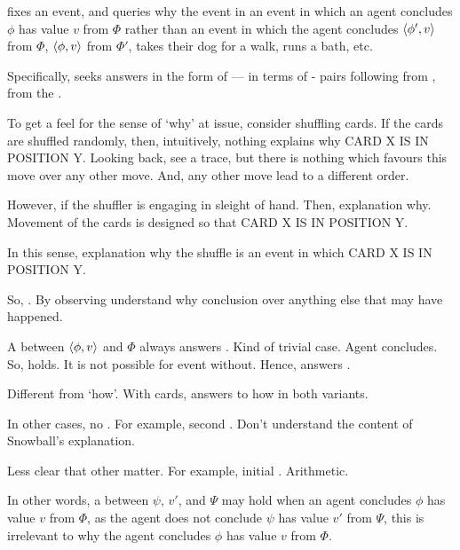 \begin{note}
  \qWhy{} fixes an event, and queries why the event in an event in which an agent concludes \(\phi\) has value \(v\) from \(\Phi\) rather than an event in which the agent concludes \(\langle \phi', v \rangle\) from \(\Phi\), \(\langle \phi, v \rangle\) from \(\Phi'\), takes their dog for a walk, runs a bath, etc.

  Specifically, \qWhy{} seeks answers in the form of  --- in terms of - pairs following from \pool{}, from the \agpe{}.
\end{note}

\begin{note}
  To get a feel for the sense of `why' at issue, consider shuffling cards.
  If the cards are shuffled randomly, then, intuitively, nothing explains why CARD X IS IN POSITION Y.
  Looking back, see a trace, but there is nothing which favours this move over any other move.
  And, any other move lead to a different order.

  However, if the shuffler is engaging in sleight of hand.
  Then, explanation why.
  Movement of the cards is designed so that CARD X IS IN POSITION Y.

  In this sense, explanation why the shuffle is an event in which CARD X IS IN POSITION Y.
\end{note}

\begin{note}
  So, \qWhy{}.
  By observing  understand why conclusion over anything else that may have happened.

  A \ros{} between \(\langle \phi, v \rangle\) and \(\Phi\) always answers \qWhy{}.
  Kind of trivial case.
  Agent concludes.
  So, \ros{} holds.
  It is not possible for event without.
  Hence, answers \qWhy{}.
\end{note}

\begin{note}
  Different from `how'.
  With cards, answers to how in both variants.
\end{note}

\begin{note}
  In other cases, no \ros{}.
  For example, second \scen{}.
  Don't understand the content of Snowball's explanation.

  Less clear that other \ros{} matter.
  For example, initial \scen{}.
  Arithmetic.

  In other words, a \ros{} between \(\psi\), \(v'\), and \(\Psi\) may hold when an agent concludes \(\phi\) has value \(v\) from \(\Phi\), as the agent does not conclude \(\psi\) has value \(v'\) from \(\Psi\), this \ros{} is irrelevant to why the agent concludes \(\phi\) has value \(v\) from \(\Phi\).
\end{note}


